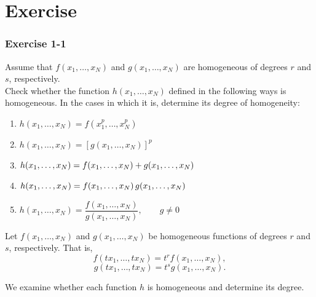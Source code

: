 
\chapter*{Exercise}

\begin{tcolorbox}[breakable]
\subsection*{Exercise 1-1}

Assume that $f(x_1, \dots, x_N)$ and $g(x_1, \dots, x_N)$ are homogeneous
of degrees $r$ and $s$, respectively. \\Check whether the function
$h(x_1, \dots, x_N)$ defined in the following ways is homogeneous.
In the cases in which it is, determine its degree of homogeneity:

\begin{enumerate}
    \item[(i)] $h(x_1, \dots, x_N) = f(x_1^p, \dots, x_N^p)$
    \item[(ii)] $h(x_1, \dots, x_N) = [g(x_1, \dots, x_N)]^p$
    \item[(iii)] $h(x_1, \dots, x_N) \\= f(x_1, \dots, x_N) + g(x_1, \dots, x_N)$
    \item[(iv)] $h(x_1, \dots, x_N) \\= f(x_1, \dots, x_N)\, g(x_1, \dots, x_N)$
    \item[(v)] $h(x_1, \dots, x_N) = \dfrac{f(x_1, \dots, x_N)}{g(x_1, \dots, x_N)}, \qquad g \neq 0$
\end{enumerate}

\end{tcolorbox}


Let $f(x_1,\dots,x_N)$ and $g(x_1,\dots,x_N)$ be homogeneous functions of degrees $r$ and $s$, respectively. That is,
\[
f(tx_1,\dots,tx_N)=t^r f(x_1,\dots,x_N),
\]
\[
g(tx_1,\dots,tx_N)=t^s g(x_1,\dots,x_N).
\]

We examine whether each function $h$ is homogeneous and determine its degree.

